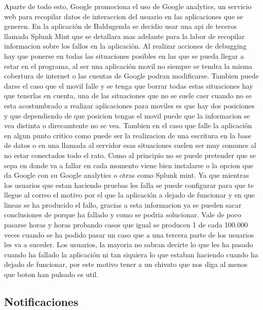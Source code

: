 Aparte de todo esto, Google promociona el uso de Google analytics, un servicio web para recopilar datos de interaccion del usuario en las aplicaciones que se generen.
En la aplicación de Baldugenda se decidio usar una api de teceros llamada Splunk Mint que se detallara mas adelante para la labor de recopilar informacion sobre los fallos en la aplicación.
 Al realizar acciones de debugging hay que ponerse en todas las situaciones posibles en las que se pueda llegar a estar en el programa, al ser una aplicación movil no siempre se tendra la misma cobertura de internet o las cuentas de Google podran modificarse.
Tambien puede darse el caso que el movil falle y se tenga que borrar  todas estas situaciones hay que tenerlas en cuenta, una de las situaciones que no se suele caer cuando no se esta acostumbrado a realizar aplicaciones para moviles es que hay dos posiciones y que dependiendo de que posicion tengas el movil puede que la informacion se vea distinta o direcamtente no se vea.
Tambien en el caso que falle la aplicación en algun punto critico como puede ser la realizacion de una escritura en la base de datos o en una llamada al servidor esas situaciones suelen ser muy comunes al no estar conectados todo el rato.
Como al principio no se puede pretender que se sepa en donde va a fallar en cada momento viene bien instalarse o la opcion que da Google con su Google analytics o otras como Splunk mint.
Ya que mientras los usuarios que estan haciendo pruebas les falla se puede configurar para que te llegue al correo el motivo por el que la aplicación a dejado de funcionar y en que  lineas se ha producido el fallo, gracias a esta informacion ya se pueden sacar conclusiones de porque ha fallado y como se podria solucionar. Vale de poco pasarse horas y horas probando casos que igual se producen 1 de cada 100.000 veces cuando se ha podido pasar un caso que a una tercera parte de los usuarios les va a suceder.
Los usuarios, la mayoria no sabran decirte lo que les ha pasado cuando ha fallado la aplicación ni tan siquiera lo que estaban haciendo cuando ha dejado de funcionar, por este motivo tener a un chivato que nos diga al menos que boton han pulsado es util.

\subsection{Notificaciones}
\label{subsecc:Notificaciones}

